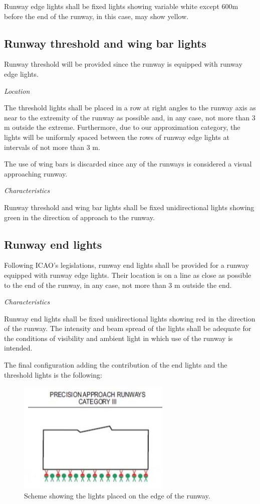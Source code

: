 		Runway edge lights shall be fixed lights showing variable white except 600m before the end of the runway, in this case, may show yellow.
		
		\subsection{Runway threshold and wing bar lights} 
		Runway threshold will be provided since the runway is equipped with runway edge lights.
		
		\textit{Location}
		
		The threshold lights shall be placed in a row at right angles to the runway axis as near to the extremity of the runway as possible and, in any case, not more than 3 m outside the extreme. Furthermore, due to our approximation category, the lights will be uniformly spaced between the rows of runway edge lights at intervals of not more than 3 m.
		
		The use of wing bars is discarded since any of the runways is considered a visual approaching runway.
		
		\textit{Characteristics}
		
		Runway threshold and wing bar lights shall be fixed unidirectional lights showing green in the direction of approach to the runway.
		
		\subsection{Runway end lights}
		Following ICAO's legislations, runway end lights shall be provided for a runway equipped with runway edge lights. Their location is on a line as close as possible to the end of the runway, in any case, not more than 3 m outside the end.
		
		\textit{Characteristics}
		
		Runway end lights shall be fixed unidirectional lights showing red in the direction of the runway. The intensity and beam spread of the lights shall be adequate for the conditions of visibility and ambient light in which use of the runway is intended.
		
		The final configuration adding the contribution of the end lights and the threshold lights is the following:
		
		\begin{figure}[H]
			\centering
			\includegraphics[clip, trim=0cm 0cm 0cm 0cm, width=0.65\textwidth]{./images/Annex14/endlights}
			\caption{Scheme showing the lights placed on the edge of the runway.} %
			\label{} %
		\end{figure}
		
